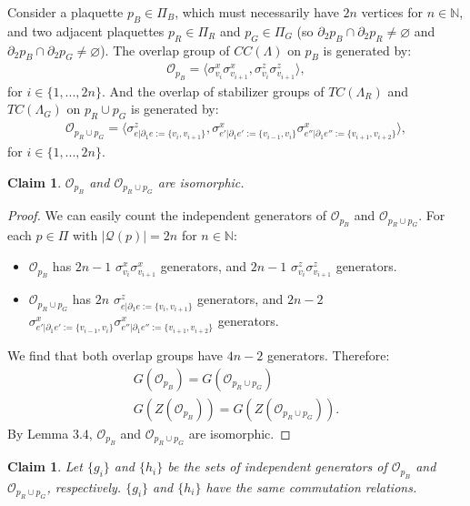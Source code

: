 \documentclass[12pt]{article}
\let\emptyset\varnothing
\def\NN{\mathbb{N}}
\newtheorem{claim}[theorem]{Claim}
\theoremstyle{definition}
\begin{document}
Consider a plaquette $p_B\in\Pi_B$, which must necessarily have $2n$ vertices for $n\in\NN$, and two adjacent plaquettes $p_R\in\Pi_R$ and $p_G\in\Pi_G$ (so $\partial_2p_B\cap\partial_2p_R\neq\emptyset$ and $\partial_2p_B\cap\partial_2p_G\neq\emptyset$). The overlap group of $CC(\Lambda)$ on $p_B$ is generated by:
    \begin{align}
        \mathcal{O}_{p_B} = \langle \sigma^x_{v_i}\sigma^x_{v_{i+1}},\sigma^z_{v_i}\sigma^z_{v_{i+1}}\rangle,
    \end{align}
for $i\in\{1,...,2n\}$. And the overlap of stabilizer groups of $TC(\Lambda_R)$ and $TC(\Lambda_G)$ on $p_R\cup p_G$ is generated by:
    \begin{align}
        \mathcal{O}_{p_R\cup p_G} = \langle\sigma^z_{e|\partial_1e := \{v_i,v_{i+1}\}},\sigma^x_{e'|\partial_1e' := \{v_{i-1},v_i\}}\sigma^x_{e''|\partial_1e'' := \{v_{i+1},v_{i+2}\}}\rangle,
    \end{align}
for $i\in\{1,...,2n\}$.\newpage
    \begin{claim}
        $\mathcal{O}_{p_B}$ and $\mathcal{O}_{p_R\cup p_G}$ are isomorphic.
    \end{claim}
    \begin{proof}
        We can easily count the independent generators of $\mathcal{O}_{p_B}$ and $\mathcal{O}_{p_R\cup p_G}$. For each $p\in\Pi$ with $|\mathcal{Q}(p)|=2n$ for $n\in\NN$:
            \begin{itemize}
                \item $\mathcal{O}_{p_B}$ has $2n-1$ $\sigma^x_{v_i}\sigma^x_{v_{i+1}}$ generators, and $2n-1$ $\sigma^z_{v_i}\sigma^z_{v_{i+1}}$ generators.
                \item $\mathcal{O}_{p_R\cup p_G}$ has $2n$ $\sigma^z_{e|\partial_1e := \{v_i,v_{i+1}\}}$ generators, and $2n-2$ $\sigma^x_{e'|\partial_1e' := \{v_{i-1},v_i\}}\sigma^x_{e''|\partial_1e'' := \{v_{i+1},v_{i+2}\}}$ generators.
            \end{itemize}
        We find that both overlap groups have $4n-2$ generators. Therefore:
            \begin{align}
                G(\mathcal{O}_{p_B}) = G(\mathcal{O}_{p_R\cup p_G})\\
                G(Z(\mathcal{O}_{p_B})) = G(Z(\mathcal{O}_{p_R\cup p_G})).
            \end{align}
        By Lemma $3.4$, $\mathcal{O}_{p_B}$ and $\mathcal{O}_{p_R\cup p_G}$ are isomorphic. 
    \end{proof}
    \begin{claim}
        Let $\{g_i\}$ and $\{h_i\}$ be the sets of independent generators of $\mathcal{O}_{p_B}$ and $\mathcal{O}_{p_R\cup p_G}$, respectively. $\{g_i\}$ and $\{h_i\}$ have the same commutation relations.
    \end{claim}
\end{document}
